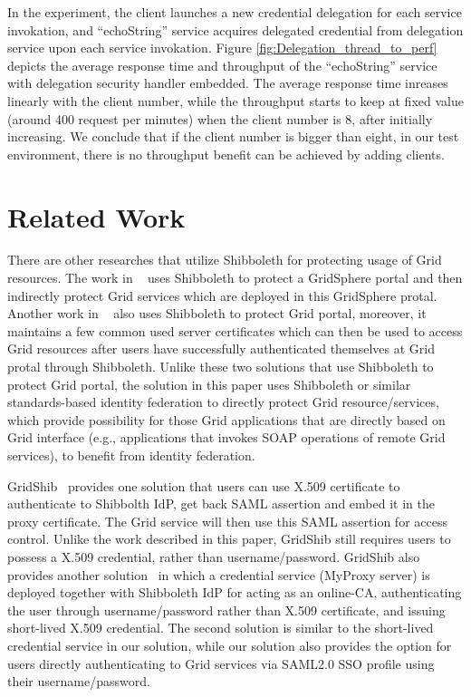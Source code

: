 \documentclass[conference]{IEEEtran}
\begin{document}
In the experiment, the client launches a new credential delegation for each service invokation, 
and ``echoString'' service acquires delegated credential from delegation service upon each 
service invokation.
Figure \ref{fig:Delegation_thread_to_perf} depicts the average response time and throughput of 
the ``echoString'' service with delegation security handler embedded. The average response time 
inreases linearly with the client number, while the throughput starts to keep at fixed value
(around 400 request per minutes) when the client number is 8, after initially increasing.
We conclude that if the client number is bigger than eight, in our test environment, there 
is no throughput benefit can be achieved by adding clients.

\section{Related Work}
\label{sec:relatedwork}
There are other researches that utilize Shibboleth for protecting usage of Grid resources. 
The work in ~\cite{J.Watt06} uses Shibboleth to protect a GridSphere portal and then 
indirectly protect Grid services which are deployed in this GridSphere protal. Another 
work in ~\cite{R.O.Sinnott06} also uses Shibboleth to protect Grid portal, moreover, it 
maintains a few common used server certificates which can then be used to access Grid 
resources after users have successfully authenticated themselves at Grid protal through
Shibboleth. Unlike these two solutions that use Shibboleth to protect Grid portal, the solution
in this paper uses Shibboleth or similar standards-based identity federation to directly protect 
Grid resource/services, which provide possibility for those Grid applications that are directly
based on Grid interface (e.g., applications that invokes SOAP operations of remote Grid services),
to benefit from identity federation.

GridShib~\cite{T.Scavo07,VWelch05} provides one solution that users can use X.509 
certificate to authenticate to Shibbolth IdP, get back SAML assertion and embed it in 
the proxy certificate. The Grid service will then use this SAML assertion for access control.
Unlike the work described in this paper, GridShib still requires users to possess a X.509 
credential, rather than username/password. GridShib also provides another 
solution~\cite{TBarton06} in which a credential service (MyProxy server) is deployed together
with Shibboleth IdP for acting as an online-CA, authenticating the user through username/password
rather than X.509 certificate, and issuing short-lived X.509 credential. The second solution
is similar to the short-lived credential service in our solution, while our solution
also provides the option for users directly authenticating to Grid services via SAML2.0 SSO 
profile using their username/password.
\end{document}
